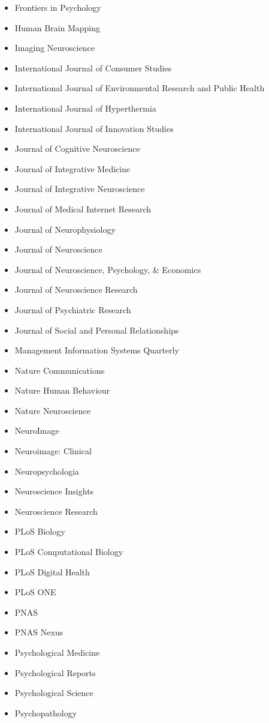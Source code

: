 \documentclass[11pt, letterpaper]{article}
\begin{document}
\begin{multicols}{2}
\begin{itemize}[noitemsep]
\item Frontiers in Psychology 
\item Human Brain Mapping 
\item Imaging Neuroscience
\item International Journal of Consumer Studies
\item International Journal of Environmental Research and Public Health
\item International Journal of Hyperthermia 
\item International Journal of Innovation Studies
\item Journal of Cognitive Neuroscience 
\item Journal of Integrative Medicine 
\item Journal of Integrative Neuroscience 
\item Journal of Medical Internet Research
\item Journal of Neurophysiology
\item Journal of Neuroscience 
\item Journal of Neuroscience, Psychology, \& Economics
\item Journal of Neuroscience Research
\item Journal of Psychiatric Research
\item Journal of Social and Personal Relationships
\item Management Information Systems Quarterly 
\item Nature Communications 
\item Nature Human Behaviour 
\item Nature Neuroscience
\item NeuroImage 
\item Neuroimage: Clinical 
\item Neuropsychologia 
\item Neuroscience Insights
\item Neuroscience Research 
\item PLoS Biology 
\item PLoS Computational Biology 
\item PLoS Digital Health 
\item PLoS ONE 
\item PNAS
\item PNAS Nexus
\item Psychological Medicine 
\item Psychological Reports
\item Psychological Science 
\item Psychopathology 

\end{itemize}
\end{multicols}
\end{document}
